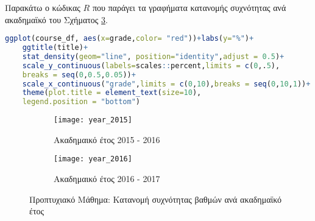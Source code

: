 \documentclass[12pt,a4paper,final]{article}
\begin{document}
Παρακάτω ο κώδικας $R$ που παράγει τα  γραφήματα κατανομής συχνότητας ανά ακαδημαϊκό του Σχήματος \ref{fig:years}.

\begin{lstlisting}[language=R]
ggplot(course_df, aes(x=grade,color= "red"))+labs(y="%")+
	ggtitle(title)+
    stat_density(geom="line", position="identity",adjust = 0.5)+
    scale_y_continuous(labels=scales::percent,limits = c(0,.5),
    breaks = seq(0,0.5,0.05))+
    scale_x_continuous("grade",limits = c(0,10),breaks = seq(0,10,1))+
    theme(plot.title = element_text(size=10),
  	legend.position = "bottom")
\end{lstlisting}
\begin{figure}[h]
	\centering
	\begin{subfigure}[b]{0.475\textwidth}
		\centering
		\texttt{[image: year\_2015]}
		\caption{Ακαδημαικό έτος 2015 - 2016}
		\label{fig:year_2015}
	\end{subfigure}
	\hfill
	\begin{subfigure}[b]{0.475\textwidth}
		\centering
		\texttt{[image: year\_2016]}
		\caption{Ακαδημαικό έτος 2016 - 2017}
		\label{fig:year_2016}
	\end{subfigure}
	\caption{Προπτυχιακό Μάθημα: Κατανομή συχνότητας βαθμών ανά ακαδημαϊκό έτος}
	\label{fig:years}
\end{figure}

\clearpage
\end{document}
